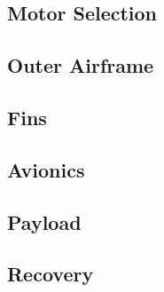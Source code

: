     \subsection{Motor Selection}
    
    
    \subsection{Outer Airframe}
    
    \subsection{Fins}
    
    \subsection{Avionics}
    
    \subsection{Payload}
    
    \subsection{Recovery}
